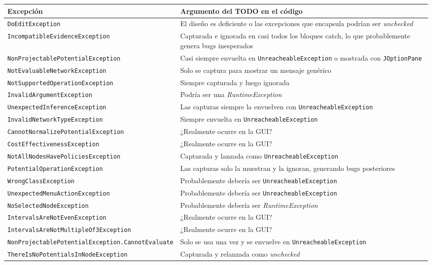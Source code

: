 \documentclass[11pt,a4paper]{article}
\newcommand{\jdot}{.\discretionary{}{}{}}
\begin{document}
{\small
\begin{longtable}{p{7.5cm}p{7.5cm}}
    \toprule
    \textbf{Excepción} & \textbf{Argumento del TODO en el código} \\
    \midrule
    \texttt{DoEditException}                    & El diseño es deficiente o las excepciones que encapsula podrían ser \textit{unchecked} \\
    \texttt{IncompatibleEvidenceException}       & Capturada e ignorada en casi todos los bloques catch, lo que probablemente genera bugs inesperados \\
    \texttt{NonProjectable\-Potential\-Exception}   & Casi siempre envuelta en \texttt{UnreacheableException} o mostrada con \texttt{JOptionPane} \\
    \texttt{NotEvaluableNetworkException}        & Solo se captura para mostrar un mensaje genérico \\
    \texttt{NotSupportedOperationException}      & Siempre capturada y luego ignorada \\
    \texttt{InvalidArgumentException}            & Podría ser una \textit{RuntimeException} \\
    \texttt{UnexpectedInferenceException}        & Las capturas siempre la envuelven con \texttt{UnreacheableException} \\
    \texttt{InvalidNetworkTypeException}         & Siempre envuelta en \texttt{UnreacheableException} \\
    \texttt{CannotNormalizePotentialException}   & ¿Realmente ocurre en la GUI? \\
    \texttt{CostEffectivenessException}          & ¿Realmente ocurre en la GUI? \\
    \texttt{NotAllNodesHavePoliciesException}    & Capturada y lanzada como \texttt{UnreacheableException} \\
    \texttt{PotentialOperationException}         & Las capturas solo la muestran y la ignoran, generando bugs posteriores \\
    \texttt{WrongClassException}                 & Probablemente debería ser \texttt{UnreacheableException} \\
    \texttt{UnexpectedMenuActionException}       & Probablemente debería ser \texttt{UnreacheableException} \\
    \texttt{NoSelectedNodeException}             & Probablemente debería ser \textit{RuntimeException} \\
    \texttt{IntervalsAreNotEvenException}        & ¿Realmente ocurre en la GUI? \\
    \texttt{IntervalsAreNotMultipleOf3Exception} & ¿Realmente ocurre en la GUI? \\
    \texttt{NonProjectable\-Potential\-Exception\jdot Can\-not\-Evaluate} & Solo se usa una vez y se envuelve en \texttt{UnreacheableException} \\
    \texttt{ThereIsNoPotentials\-InNodeException} & Capturada y relanzada como \textit{unchecked} \\
    \bottomrule
\end{longtable}
}
\end{document}
